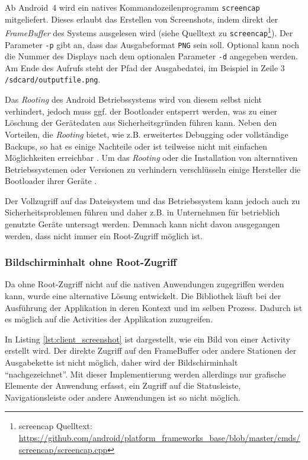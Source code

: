 Ab Android~4 wird ein natives Kommandozeilenprogramm \texttt{screencap} mitgeliefert.
Dieses erlaubt das Erstellen von Screenshots, indem direkt der \emph{FrameBuffer} des Systems ausgelesen wird (siehe Quelltext zu \texttt{screencap}\footnote{screencap Quelltext: \url{https://github.com/android/platform_frameworks_base/blob/master/cmds/screencap/screencap.cpp}}).
Der Parameter \texttt{-p} gibt an, dass das Ausgabeformat \texttt{PNG} sein soll. 
Optional kann noch die Nummer des Displays nach dem optionalen Parameter \texttt{-d} angegeben werden.
Am Ende des Aufrufs steht der Pfad der Ausgabedatei, im Beispiel in Zeile 3 \texttt{/sdcard/outputfile.png}. 

Das \emph{Rooting} des Android Betriebssystems wird von diesem selbst nicht verhindert, jedoch muss ggf. der Bootloader entsperrt werden, was zu einer Löschung der Gerätedaten aus Sicherheitsgründen führen kann. 
Neben den Vorteilen, die \emph{Rooting} bietet, wie z.B. erweitertes Debugging oder vollständige Backups, so hat es einige Nachteile oder ist teilweise nicht mit einfachen Möglichkeiten erreichbar \cite[vgl.][]{androidsecurity}.
Um das \emph{Rooting} oder die Installation von alternativen Betriebssystemen oder Versionen zu verhindern verschlüsseln einige Hersteller die Bootloader ihrer Geräte \cite[vgl.][6\psq]{androiddataintegrity}.

Der Vollzugriff auf das Dateisystem und das Betriebssystem kann jedoch auch zu Sicherheitsproblemen führen und daher z.B. in Unternehmen für betrieblich genutzte Geräte untersagt werden.
Demnach kann nicht davon ausgegangen werden, dass nicht immer ein Root-Zugriff möglich ist.

\subsubsection{Bildschirminhalt ohne Root-Zugriff}
Da ohne Root-Zugriff nicht auf die nativen Anwendungen zugegriffen werden kann, wurde eine alternative Lösung entwickelt.
Die Bibliothek läuft bei der Ausführung der Applikation in deren Kontext und im selben Prozess.
Dadurch ist es möglich auf die Activities der Applikation zuzugreifen.

In Listing \ref{lst:client_screenshot} ist dargestellt, wie ein Bild von einer Activity erstellt wird.
Der direkte Zugriff auf den FrameBuffer oder andere Stationen der Ausgabekette ist nicht möglich, daher wird der Bildschirminhalt \enquote{nachgezeichnet}.
Mit dieser Implementierung werden allerdings nur grafische Elemente der Anwendung erfasst, ein Zugriff auf die Statusleiste, Navigationsleiste oder andere Anwendungen ist so nicht möglich.


